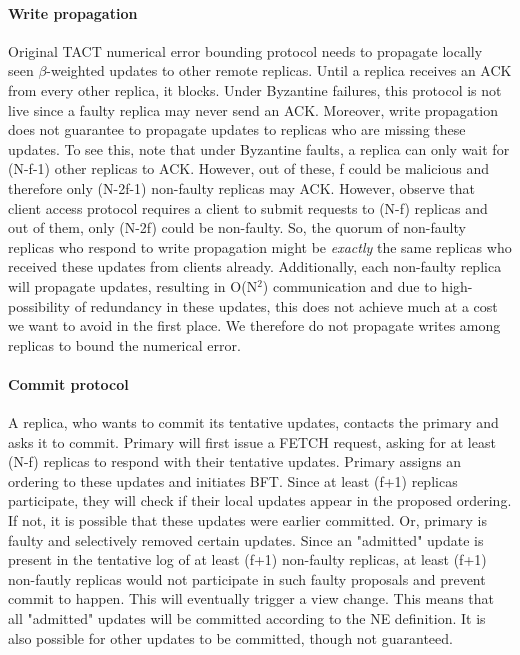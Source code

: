 \documentclass[twocolumn,10pt]{article}
\begin{document}
{\paragraph{Write propagation} Original TACT numerical error bounding protocol
needs to propagate locally seen $\beta$-weighted updates to  
other remote replicas. Until a replica receives an ACK from every other replica,
it blocks. Under Byzantine failures, this protocol is not live since a faulty
replica may never send an ACK. Moreover, write propagation does not guarantee
to propagate updates to replicas who are missing these updates.
To see this, note that under Byzantine faults, a replica can only wait 
for (N-f-1) other replicas to ACK. However, out of these, f could be malicious 
and therefore only (N-2f-1) non-faulty replicas may ACK. 
However, observe that client access protocol requires a client to submit
requests to (N-f) replicas and out of them, only (N-2f) could be non-faulty.
So, the quorum of non-faulty replicas who respond to write propagation
might be \textit{exactly} the same replicas who received these updates
from clients already.
Additionally, each non-faulty replica will propagate updates, resulting in
O(N$^2$) communication and due to high-possibility of redundancy
in these updates, this does not achieve much at a cost we want to
avoid in the first place. We therefore
do not propagate writes among replicas to bound the numerical error.

\paragraph{Commit protocol} A replica, who wants to 
commit its tentative updates, contacts the primary and asks it
to commit. Primary will first issue a FETCH request, asking for
at least (N-f) replicas to respond with their tentative updates.
Primary assigns an ordering to these updates and initiates BFT.
Since at least (f+1) replicas participate, they will check if their
local updates appear in the proposed ordering. If not, it is possible
that these updates were earlier committed. Or, primary is faulty 
and selectively removed certain updates. Since an "admitted" update
is present in the tentative log of at least (f+1) non-faulty replicas, at 
least (f+1) non-fautly replicas would not participate in such faulty
proposals and prevent commit to happen. This will eventually trigger a
view change. This means that all "admitted" 
updates will be committed according to the NE definition. It is also 
possible for other updates to be committed, though not guaranteed.


}
\end{document}
